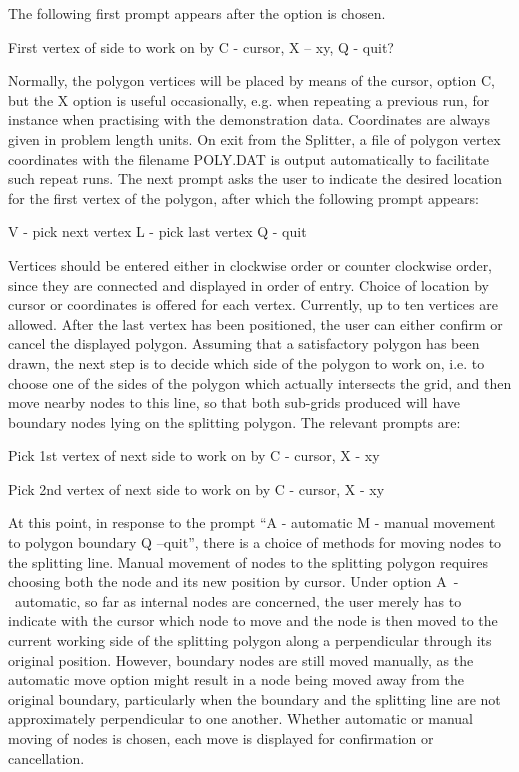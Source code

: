 \documentclass{article}
\begin{document}
The following first prompt appears after the option is chosen.

First vertex of side to work on by C - cursor, X -- xy, Q - quit?

Normally, the polygon vertices will be placed by means of the cursor, option C, but the X option is useful occasionally, e.g. when repeating a previous run, for instance when practising with the demonstration data. Coordinates are always given in problem length units. On exit from the Splitter, a file of polygon vertex coordinates with the filename POLY.DAT is output automatically to facilitate such repeat runs. The next prompt asks the user to indicate the desired location for the first vertex of the polygon, after which the following prompt appears:

V - pick next vertex L - pick last vertex Q - quit

Vertices should be entered either in clockwise order or counter clockwise order, since they are connected and displayed in order of entry. Choice of location by cursor or coordinates is offered for each vertex. Currently, up to ten vertices are allowed. After the last vertex has been positioned, the user can either confirm or cancel the displayed polygon. Assuming that a satisfactory polygon has been drawn, the next step is to decide which side of the polygon to work on, i.e. to choose one of the sides of the polygon which actually intersects the grid, and then move nearby nodes to this line, so that both sub-grids produced will have boundary nodes lying on the splitting polygon. The relevant prompts are:

Pick 1st vertex of next side to work on by C - cursor, X - xy

Pick 2nd vertex of next side to work on by C - cursor, X - xy

At this point, in response to the prompt ``A - automatic M - manual movement to polygon boundary Q --quit'', there is a choice of methods for moving nodes to the splitting line. Manual movement of nodes to the splitting polygon requires choosing both the node and its new position by cursor. Under option A~-~automatic, so far as internal nodes are concerned, the user merely has to indicate with the cursor which node to move and the node is then moved to the current working side of the splitting polygon along a perpendicular through its original position. However, boundary nodes are still moved manually, as the automatic move option might result in a node being moved away from the original boundary, particularly when the boundary and the splitting line are not approximately perpendicular to one another. Whether automatic or manual moving of nodes is chosen, each move is displayed for confirmation or cancellation.
\end{document}
